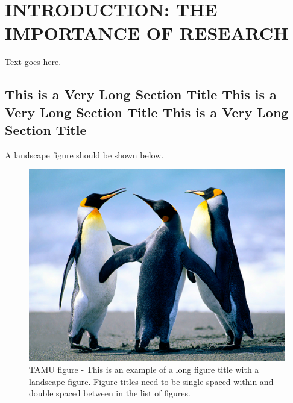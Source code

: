 %
%
%



\pagestyle{plain} %
\setcounter{page}{1}


\chapter{\uppercase {Introduction: The Importance of Research}}


Text goes here.

\section{This is a Very Long Section Title This is a Very Long Section Title This is a Very Long Section Title }

A landscape figure should be shown below. 
\begin{figure}
\centering
\includegraphics[scale=.50]{figures/Penguins.jpg}
\caption{TAMU figure - This is an example of a long figure title with a landscape figure.  Figure titles need to be single-spaced within and double spaced between in the list of figures.}
\label{fig:tamu-fig1-1}
\end{figure}


